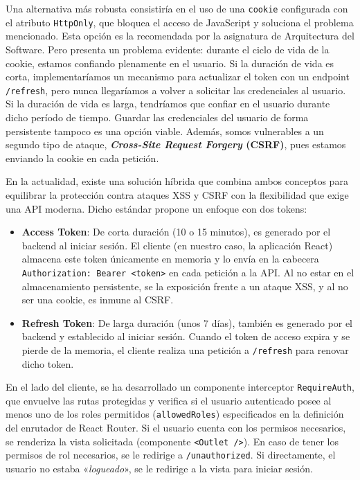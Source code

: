 \documentclass[11pt]{article}
\begin{document}
      Una alternativa más robusta consistiría en el uso de una \texttt{cookie}
      configurada con el atributo \texttt{HttpOnly}, que bloquea el acceso de
      JavaScript y soluciona el problema mencionado. Esta opción es la recomendada
      por la asignatura de Arquitectura del Software. Pero presenta un problema
      evidente: durante el ciclo de vida de la cookie, estamos confiando plenamente
      en el usuario. Si la duración de vida es corta, implementaríamos un mecanismo
      para actualizar el token con un endpoint \texttt{/refresh}, pero nunca
      llegaríamos a volver a solicitar las credenciales al usuario. Si la duración de
      vida es larga, tendríamos que confiar en el usuario durante dicho período de
      tiempo. Guardar las credenciales del usuario de forma persistente tampoco es
      una opción viable. Además, somos vulnerables a un segundo tipo de ataque,
      \textbf{\textit{Cross-Site Request Forgery} (CSRF)}, pues estamos enviando la
      cookie en cada petición.

      En la actualidad, existe una solución híbrida que combina ambos conceptos para
      equilibrar la protección contra ataques XSS y CSRF con la flexibilidad que
      exige una API moderna. Dicho estándar propone un enfoque con dos tokens:

      \begin{itemize}
          \item \textbf{Access Token}: De corta duración (10 o 15 minutos), es generado por el backend al iniciar sesión. El cliente (en nuestro caso, la aplicación React) almacena este token únicamente en memoria y lo envía en la cabecera \texttt{Authorization: Bearer <token>} en cada petición a la API. Al no estar en el almacenamiento persistente, se la exposición frente a un ataque XSS, y al no ser una cookie, es inmune al CSRF.

          \item \textbf{Refresh Token}: De larga duración (unos 7 días), también es generado por el backend y establecido al iniciar sesión. Cuando el token de acceso expira y se pierde de la memoria, el cliente realiza una petición a \texttt{/refresh} para renovar dicho token.
      \end{itemize}

      En el lado del cliente, se ha desarrollado un componente interceptor
      \texttt{RequireAuth}, que envuelve las rutas protegidas y verifica si el
      usuario autenticado posee al menos uno de los roles permitidos
      (\texttt{allowedRoles}) especificados en la definición del enrutador de React
      Router. Si el usuario cuenta con los permisos necesarios, se renderiza la vista
      solicitada (componente \texttt{<Outlet />}). En caso de tener los permisos de
      rol necesarios, se le redirige a \texttt{/unauthorized}. Si directamente, el
      usuario no estaba «\textit{logueado}», se le redirige a la vista para iniciar
      sesión.
\end{document}
